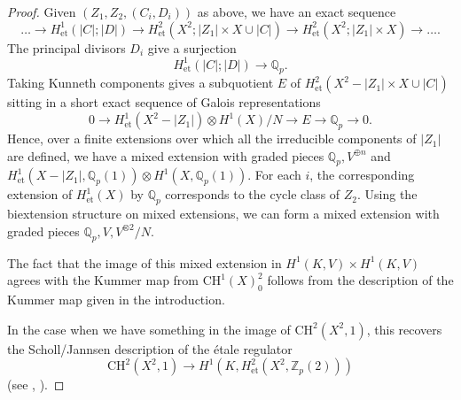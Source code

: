\documentclass[11pt]{amsart}
\def\Z{\mathbb Z}
\def\Q{\mathbb Q}
\theoremstyle{plain}
\newtheorem{lemma}{Lemma}
\theoremstyle{definition}
\newtheorem{remark}{Remark}
\newcommand{\Jac}{\mathrm{Jac}}
\newcommand{\CH}{\mathrm{CH}}
\newcommand{\et}{\mathrm{et}}
\begin{document}
\begin{proof}
Given $(Z_1 ,Z_2 ,(C_i ,D_i ))$ as above, we have an exact sequence
\[
\ldots \to H^1 _{\et }(|C|; |D|)\to  H^2 _{\et }(X^2 ; |Z_1 | \times X \cup |C|) \to H^2 _{\et }(X^2  ; |Z_1 |\times X) \to \ldots .
\]
The principal divisors $D_i$ give a surjection
\[
H^1 _{\et }(|C|; |D|) \to \Q _p .
\]
Taking Kunneth components gives a subquotient $E$ of $H^2 _{\et }(X^2 -|Z_1 |\times X \cup |C|)$ sitting in a short exact sequence of Galois representations
\[
0\to H^1 _{\et }(X^2 -|Z_1 |)\otimes H^1 (X)/N\to E\to \Q _p \to 0.
\]
Hence, over a finite extensions over which all the irreducible components of $|Z_1 |$ are defined, we have a mixed extension with graded pieces $\Q _p ,V^{\oplus n}$ and $H^1 _{\et }(X-|Z_1 |,\Q _p (1))\otimes H^1 (X,\Q _p (1))$. 
For each $i$, the corresponding extension of $H^1 _{\et }(X)$ by $\Q _p $ corresponds to the cycle class of $Z_2 $. Using the biextension structure on mixed extensions, we can form a mixed extension with graded pieces $\Q _p ,V, V^{\otimes 2}/N$.

The fact that the image of this mixed extension in $H^1 (K,V)\times H^1 (K,V)$ agrees with the Kummer map from $\CH ^1 (X)_0 ^2 $ follows from the description of the Kummer map given in the introduction.

In the case when we have something in the image of $\CH ^2 (X^2 ,1)$, this recovers the Scholl/Jannsen description of the \'etale regulator
\[
\CH ^2 (X^2 ,1)\to H^1 (K,H^2 _{\et }(X^2 ,\Z _p (2)))
\]
(see \cite[Appendix C.3]{jannsen1990}, \cite{scholl:ext}).
\end{proof}
\end{document}
